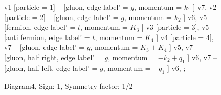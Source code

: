 \documentclass{revtex4}
\begin{document}
\begin{figure}[!htb]
\begin{center}
{    %
v1 [particle = \(1\)] -- [gluon, edge label' = \(g\), momentum = \(k_{1}\) ] v7, 
v2 [particle = \(2\)] -- [gluon, edge label' = \(g\), momentum = \(k_{2}\) ] v6, 
v5 -- [fermion, edge label' = \(t\), momentum = \(K_{3}\) ] v3 [particle = \(3\)], 
v5 -- [anti fermion, edge label' = \(\overline{t}\), momentum = \(K_{4}\) ] v4 [particle = \(4\)], 
v7 -- [gluon, edge label' = \(g\), momentum = \(K_{3} + K_{4}\) ] v5, 
v7 -- [gluon, half right, edge label' = \(g\), momentum = \(-k_{2} + q_{1}\) ] v6, 
v7 -- [gluon, half left, edge label' = \(g\), momentum = \(-q_{1}\) ] v6, 
};
\end{center}
\caption{Diagram4, Sign: 1, Symmetry factor: 1/2}
\end{figure}
\newpage
\end{document}
